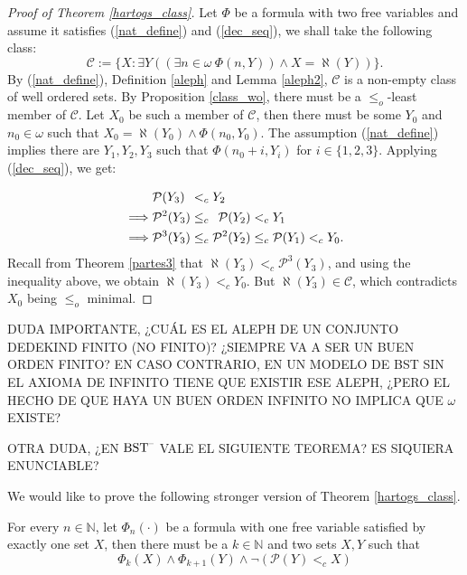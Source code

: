 \begin{proof}[Proof of Theorem \ref{hartogs_class}]
	Let $\Phi$ be a formula with two free variables and assume it satisfies (\ref{nat_define}) and (\ref{dec_seq}), we shall take the following class:
	\[
		 \mathcal{C} := \{X: \exists Y ((\exists n\in\omega \ \Phi(n,Y)) \land X = \aleph(Y))\}.
	\]
	By (\ref{nat_define}), Definition \ref{aleph} and Lemma \ref{aleph2}, $\mathcal{C}$ is a non-empty class of well ordered sets. By Proposition \ref{class_wo}, there must be a $\leq_o$-least member of $\mathcal{C}$.
	Let $X_0$ be such a member of $\mathcal{C}$, then there must be some $Y_0$ and $n_0 \in\omega$ such that $X_0 = \aleph(Y_0) \land \Phi(n_0,Y_0)$.
	The assumption (\ref{nat_define}) implies there are $Y_1 , Y_2, Y_3$ such that $\Phi(n_0 + i , Y_i)$ for $i\in\{1,2,3\}$.
	Applying (\ref{dec_seq}), we get:
	
	\begin{align*}
		&\mathcal{P}(Y_3) \hspace{4.5 pt} <_c Y_2
		\\ \implies &\mathcal{P}^2(Y_3) \leq_c \hspace{4.5 pt} \mathcal{P}(Y_2) <_c Y_1
		\\ \implies &\mathcal{P}^3(Y_3) \leq_c \mathcal{P}^{2}(Y_2) \leq_c \mathcal{P}(Y_1) <_c Y_0.
	\end{align*}
	Recall from Theorem \ref{partes3} that $\aleph(Y_3) <_c \mathcal{P}^{3}(Y_3)$, and using the inequality above, we obtain $\aleph(Y_3) <_c Y_0$. But $\aleph(Y_3)\in\mathcal{C}$, which contradicts $X_0$ being $\leq_o$ minimal. 
\end{proof}

DUDA IMPORTANTE, ¿CUÁL ES EL ALEPH DE UN CONJUNTO DEDEKIND FINITO (NO FINITO)? ¿SIEMPRE VA A SER UN BUEN ORDEN FINITO? EN CASO CONTRARIO, EN UN MODELO DE BST SIN EL AXIOMA DE INFINITO TIENE QUE EXISTIR ESE ALEPH, ¿PERO EL HECHO DE QUE HAYA UN BUEN ORDEN INFINITO NO IMPLICA QUE $\omega$ EXISTE?

OTRA DUDA, ¿EN $\operatorname{\text{BST}^{--}}$ VALE EL SIGUIENTE TEOREMA? ES SIQUIERA ENUNCIABLE?

We would like to prove the following stronger version of Theorem \ref{hartogs_class}.

\begin{theorem}[$\estf$]
	\label{hartogs_inf_classes}
	For every $n\in\mathbb{N}$, let $\Phi_n(\cdot)$ be a formula with one free variable satisfied by exactly one set $X$, then there must be a $k \in \mathbb{N}$ and two sets $X,Y$ such that 
	\[
		\Phi_k (X) \land \Phi_{k+1} (Y) \land \neg(\mathcal{P}(Y) <_c X)
	\]
\end{theorem}


